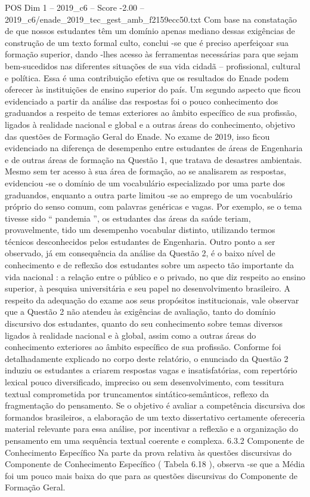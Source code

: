 \begin{textsample}{POS Dim 1 – 2019\_c6 – Score -2.00 – 2019\_c6/enade\_2019\_tec\_gest\_amb\_f2159ecc50.txt}
Com base na constatação de que nossos estudantes têm um domínio apenas mediano dessas exigências de construção de um texto formal culto, conclui -se que é preciso aperfeiçoar sua formação superior, dando -lhes acesso às ferramentas necessárias para que sejam bem-sucedidos nas diferentes situações de sua vida cidadã – profissional, cultural e política.
Essa é uma contribuição efetiva que os resultados do Enade podem oferecer às instituições de ensino superior do país.
Um segundo aspecto que ficou evidenciado a partir da análise das respostas foi o pouco conhecimento dos graduandos a respeito de temas exteriores ao âmbito específico de sua profissão, ligados à realidade nacional e global e a outras áreas do conhecimento, objetivo das questões de Formação Geral do Enade.
No exame de 2019, isso ficou evidenciado na diferença de desempenho entre estudantes de áreas de Engenharia e de outras áreas de formação na Questão 1, que tratava de desastres ambientais.
Mesmo sem ter acesso à sua área de formação, ao se analisarem as respostas, evidenciou -se o domínio de um vocabulário especializado por uma parte dos graduandos, enquanto a outra parte limitou -se ao emprego de um vocabulário próprio do senso comum, com palavras genéricas e vagas.
Por exemplo, se o tema tivesse sido “ pandemia ”, os estudantes das áreas da saúde teriam, provavelmente, tido um desempenho vocabular distinto, utilizando termos técnicos desconhecidos pelos estudantes de Engenharia.
Outro ponto a ser observado, já em consequência da análise da Questão 2, é o baixo nível de conhecimento e de reflexão dos estudantes sobre um aspecto tão importante da vida nacional : a relação entre o público e o privado, no que diz respeito ao ensino superior, à pesquisa universitária e seu papel no desenvolvimento brasileiro.
A respeito da adequação do exame aos seus propósitos institucionais, vale observar que a Questão 2 não atendeu às exigências de avaliação, tanto do domínio discursivo dos estudantes, quanto do seu conhecimento sobre temas diversos ligados à realidade nacional e à global, assim como a outras áreas do conhecimento exteriores ao âmbito específico de sua profissão.
Conforme foi detalhadamente explicado no corpo deste relatório, o enunciado da Questão 2 induziu os estudantes a criarem respostas vagas e insatisfatórias, com repertório lexical pouco diversificado, impreciso ou sem desenvolvimento, com tessitura textual comprometida por truncamentos sintático-semânticos, reflexo da fragmentação do pensamento.
Se o objetivo é avaliar a competência discursiva dos formandos brasileiros, a elaboração de um texto dissertativo certamente ofereceria material relevante para essa análise, por incentivar a reflexão e a organização do pensamento em uma sequência textual coerente e complexa. 6.3.2 Componente de Conhecimento Específico Na parte da prova relativa às questões discursivas do Componente de Conhecimento Específico ( Tabela 6.18 ), observa -se que a Média foi um pouco mais baixa do que para as questões discursivas do Componente de Formação Geral.

\end{textsample}

